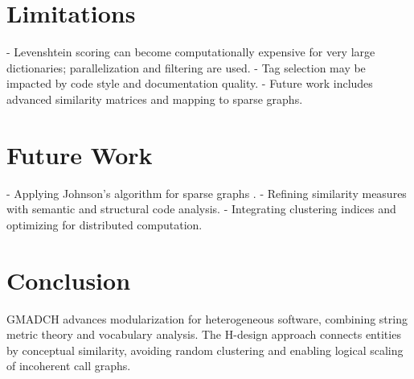 \documentclass[a4paper,12pt]{article}
\begin{document}
\section{Limitations}
- Levenshtein scoring can become computationally expensive for very large dictionaries; parallelization and filtering are used.
- Tag selection may be impacted by code style and documentation quality.
- Future work includes advanced similarity matrices and mapping to sparse graphs.

\section{Future Work}
- Applying Johnson's algorithm for sparse graphs \cite{Cormen1990}.
- Refining similarity measures with semantic and structural code analysis.
- Integrating clustering indices and optimizing for distributed computation.

\section{Conclusion}
GMADCH advances modularization for heterogeneous software, combining string metric theory and vocabulary analysis. The H-design approach connects entities by conceptual similarity, avoiding random clustering and enabling logical scaling of incoherent call graphs.
\end{document}
